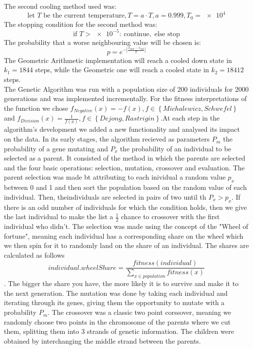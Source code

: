 \documentclass{article}
\newcommand{\euler}{e}
\begin{document}
The second cooling method used was:
$$ \text{let } T \text{ be the current temperature}, T = a \cdot T, a = 0.999, T_0 = \num{e4} $$
The stopping condition for the second method was:
$$ \text{if } T > \num{e-5}\colon\  \text{continue}, \text{ else stop} $$
The probability that a worse neighbouring value will be chosen is: 
$$p = \euler^{-|\frac{x_{\text{new}} - x_{\text{old}}}{T}|}$$
The Geometric Arithmetic implementation will reach a cooled down state in $ k_1 = 1844 $ steps, while the Geometric one will reach a cooled state in $ k_2 = 18412 $ steps.\\
The Genetic Algorithm was run with a population size of 200 individuals for 2000 generations and was implemented incrementally. For the fitness interpretations of the function we chose $f_{Negative}(x) = -f(x), f \in \left\{Michalewicz, Schwefel \right\}$ and $f_{Division}(x) = \frac{1}{f(x)}, f \in \left\{Dejong, Rastrigin \right\}$.At each step in the algorithm's development we added a new functionality and analysed its impact on the data. In its early stages, the algorithm recieved as parameters $P_m$ the probability of a gene mutating and $P_x$ the probability of an individual to be selected as a parent. It consisted of the method in which the parents are selected and the four basic operations: selection, mutation, crossover and evaluation. The parent selection was made bt attributing to each inividual a random value $p_x$ between 0 and 1 and then sort the population based on the random value of each individual. Then, theindividuals are selected in pairs of two until th $P_x > p_x$. If there is an odd number of individuals for which the condition holds, then we give the last individual to make the list a $\frac{1}{2}$ chance to crossover with the first individual who didn't. The selection was made using the concept of the "Wheel of fortune", meaning each individual has a corresponding share on the wheel which we then spin for it to randomly land on the share of an individual. The shares are calculated as follows $$individual.wheelShare = \frac{fitness(individual)}{\sum_{x \in population}fitness(x)}$$. The bigger the share you have, the more likely it is to survive and make it to the next generation. The mutation was done by taking each individual and iterating through its genes, giving them the opportunity to mutate with a probability $P_m$. The crossover was a classic two point corssover, meaning we randomly choose two points in the chromosome of the parents where we cut them, splitting them into 3 strands of genetic information. The children were obtained by interchanging the middle strand between the parents.\\
\end{document}
